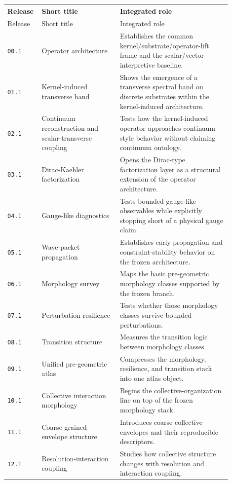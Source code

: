 \documentclass[11pt]{article}
\begin{document}
\small
\begin{longtable}{p{0.10\linewidth}p{0.33\linewidth}p{0.47\linewidth}}
\toprule
Release & Short title & Integrated role \\
\midrule
\endfirsthead
\toprule
Release & Short title & Integrated role \\
\midrule
\endhead
\bottomrule
\endfoot
\texttt{00.1} & Operator architecture & Establishes the common kernel/substrate/operator-lift frame and the scalar/vector interpretive baseline. \\
\texttt{01.1} & Kernel-induced transverse band & Shows the emergence of a transverse spectral band on discrete substrates within the kernel-induced architecture. \\
\texttt{02.1} & Continuum reconstruction and scalar-transverse coupling & Tests how the kernel-induced operator approaches continuum-style behavior without claiming continuum ontology. \\
\texttt{03.1} & Dirac-Kaehler factorization & Opens the Dirac-type factorization layer as a structural extension of the operator architecture. \\
\texttt{04.1} & Gauge-like diagnostics & Tests bounded gauge-like observables while explicitly stopping short of a physical gauge claim. \\
\texttt{05.1} & Wave-packet propagation & Establishes early propagation and constraint-stability behavior on the frozen architecture. \\
\texttt{06.1} & Morphology survey & Maps the basic pre-geometric morphology classes supported by the frozen branch. \\
\texttt{07.1} & Perturbation resilience & Tests whether those morphology classes survive bounded perturbations. \\
\texttt{08.1} & Transition structure & Measures the transition logic between morphology classes. \\
\texttt{09.1} & Unified pre-geometric atlas & Compresses the morphology, resilience, and transition stack into one atlas object. \\
\texttt{10.1} & Collective interaction morphology & Begins the collective-organization line on top of the frozen morphology stack. \\
\texttt{11.1} & Coarse-grained envelope structure & Introduces coarse collective envelopes and their reproducible descriptors. \\
\texttt{12.1} & Resolution-interaction coupling & Studies how collective structure changes with resolution and interaction coupling. \\

\end{longtable}
\end{document}
